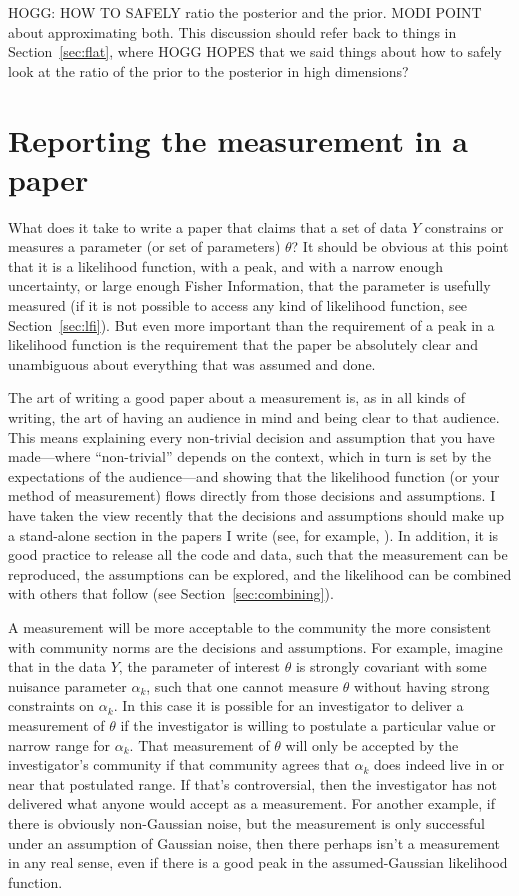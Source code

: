 \documentclass{article}
\newcommand{\sectionname}{Section}
\newcommand{\secref}[1]{\sectionname~\ref{#1}}
\begin{document}
HOGG: HOW TO SAFELY ratio the posterior and the prior. MODI POINT about approximating both.
This discussion should refer back to things in \secref{sec:flat}, where HOGG HOPES that we said things about how to safely look at the ratio of the prior to the posterior in high dimensions?

\section{Reporting the measurement in a paper}\label{sec:claim}
What does it take to write a paper that claims that a set of data $Y$ constrains or measures a parameter (or set of parameters) $\theta$?
It should be obvious at this point that it is a likelihood function, with a peak, and with a narrow enough uncertainty, or large enough Fisher Information, that the parameter is usefully measured
(if it is not possible to access any kind of likelihood function, see \secref{sec:lfi}).
But even more important than the requirement of a peak in a likelihood function is the requirement that the paper be absolutely clear and unambiguous about everything that was assumed and done.

The art of writing a good paper about a measurement is, as in all kinds of writing, the art of having an audience in mind and being clear to that audience.
This means explaining every non-trivial decision and assumption that you have made---where ``non-trivial'' depends on the context, which in turn is set by the expectations of the audience---and showing that the likelihood function (or your method of measurement) flows directly from those decisions and assumptions.
I have taken the view recently that the decisions and assumptions should make up a stand-alone section in the papers I write (see, for example, \cite{frizzle}).
In addition, it is good practice to release all the code and data, such that the measurement can be reproduced, the assumptions can be explored, and the likelihood can be combined with others that follow (see \secref{sec:combining}).

A measurement will be more acceptable to the community the more consistent with community norms are the decisions and assumptions.
For example, imagine that in the data $Y$, the parameter of interest $\theta$ is strongly covariant with some nuisance parameter $\alpha_k$,
such that one cannot measure $\theta$ without having strong constraints on $\alpha_k$.
In this case it is possible for an investigator to deliver a measurement of $\theta$ if the investigator is willing to postulate a particular value or narrow range for $\alpha_k$.
That measurement of $\theta$ will only be accepted by the investigator's community if that community agrees that $\alpha_k$ does indeed live in or near that postulated range.
If that's controversial, then the investigator has not delivered what anyone would accept as a measurement.
For another example, if there is obviously non-Gaussian noise, but the measurement is only successful under an assumption of Gaussian noise, then there perhaps isn't a measurement in any real sense, even if there is a good peak in the assumed-Gaussian likelihood function.
\end{document}
